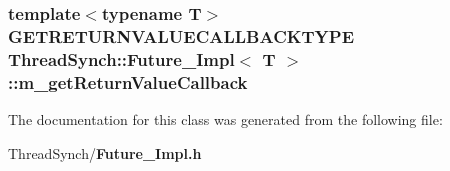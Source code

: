 \subsubsection{\setlength{\rightskip}{0pt plus 5cm}template$<$typename T$>$ {\bf GETRETURNVALUECALLBACKTYPE} {\bf Thread\-Synch::Future\_\-Impl}$<$ T $>$::{\bf m\_\-get\-Return\-Value\-Callback}\hspace{0.3cm}{\tt  [private]}}\label{class_thread_synch_1_1_future___impl_bda190d40c6b655ee9f27bae5af05c3f}




The documentation for this class was generated from the following file:\begin{CompactItemize}
\item 
Thread\-Synch/{\bf Future\_\-Impl.h}\end{CompactItemize}
